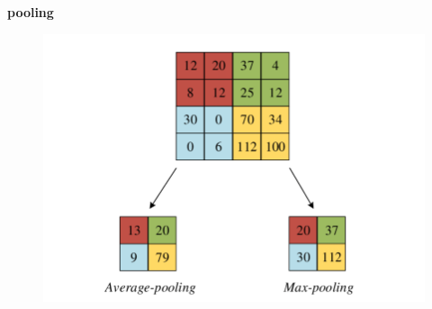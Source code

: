 \documentclass[xcolor=dvipsnames]{beamer}
\begin{document}
\begin{frame}{\bf pooling}

\begin{figure}
  \includegraphics[scale=0.2]{../images/pooling.png}
\end{figure}

\end{frame}
\end{document}
